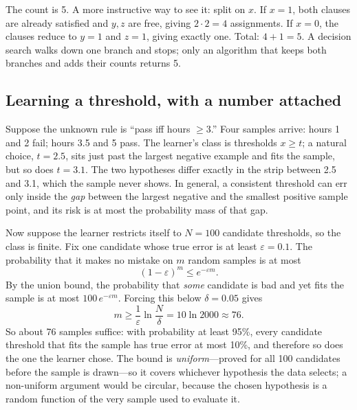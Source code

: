 The count is 5. A more instructive way to see it: split on \(x\). If \(x=1\), both clauses are already satisfied and \(y,z\) are free, giving \(2\cdot2=4\) assignments. If \(x=0\), the clauses reduce to \(y=1\) and \(z=1\), giving exactly one. Total: \(4+1=5\). A decision search walks down one branch and stops; only an algorithm that keeps both branches and adds their counts returns 5.

\subsection{Learning a threshold, with a number attached}
Suppose the unknown rule is ``pass iff hours \(\ge 3\).'' Four samples arrive: hours 1 and 2 fail; hours 3.5 and 5 pass. The learner's class is thresholds \(x\ge t\); a natural choice, \(t=2.5\), sits just past the largest negative example and fits the sample, but so does \(t=3.1\). The two hypotheses differ exactly in the strip between 2.5 and 3.1, which the sample never shows. In general, a consistent threshold can err only inside the \emph{gap} between the largest negative and the smallest positive sample point, and its risk is at most the probability mass of that gap.

Now suppose the learner restricts itself to \(N=100\) candidate thresholds, so the class is finite. Fix one candidate whose true error is at least \(\varepsilon=0.1\). The probability that it makes no mistake on \(m\) random samples is at most
\[
(1-\varepsilon)^m\le e^{-\varepsilon m}.
\]
By the union bound, the probability that \emph{some} candidate is bad and yet fits the sample is at most \(100\,e^{-\varepsilon m}\). Forcing this below \(\delta=0.05\) gives
\[
m\ge\frac{1}{\varepsilon}\ln\frac{N}{\delta}=10\ln 2000\approx 76.
\]
So about 76 samples suffice: with probability at least 95\%, every candidate threshold that fits the sample has true error at most 10\%, and therefore so does the one the learner chose. The bound is \emph{uniform}---proved for all 100 candidates before the sample is drawn---so it covers whichever hypothesis the data selects; a non-uniform argument would be circular, because the chosen hypothesis is a random function of the very sample used to evaluate it.

